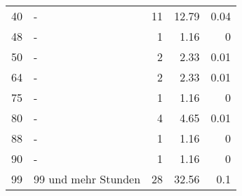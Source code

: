 \begin{longtable}{lXrrr}
        40 & \multicolumn{1}{X}{-} & %
          \num{11} &
          \num[round-mode=places,round-precision=2]{12,79} &
          \num[round-mode=places,round-precision=2]{0,04} \\

        48 & \multicolumn{1}{X}{-} & %
          \num{1} &
          \num[round-mode=places,round-precision=2]{1,16} &
          \num[round-mode=places,round-precision=2]{0} \\

        50 & \multicolumn{1}{X}{-} & %
          \num{2} &
          \num[round-mode=places,round-precision=2]{2,33} &
          \num[round-mode=places,round-precision=2]{0,01} \\

        64 & \multicolumn{1}{X}{-} & %
          \num{2} &
          \num[round-mode=places,round-precision=2]{2,33} &
          \num[round-mode=places,round-precision=2]{0,01} \\

        75 & \multicolumn{1}{X}{-} & %
          \num{1} &
          \num[round-mode=places,round-precision=2]{1,16} &
          \num[round-mode=places,round-precision=2]{0} \\

        80 & \multicolumn{1}{X}{-} & %
          \num{4} &
          \num[round-mode=places,round-precision=2]{4,65} &
          \num[round-mode=places,round-precision=2]{0,01} \\

        88 & \multicolumn{1}{X}{-} & %
          \num{1} &
          \num[round-mode=places,round-precision=2]{1,16} &
          \num[round-mode=places,round-precision=2]{0} \\

        90 & \multicolumn{1}{X}{-} & %
          \num{1} &
          \num[round-mode=places,round-precision=2]{1,16} &
          \num[round-mode=places,round-precision=2]{0} \\

        99 & \multicolumn{1}{X}{99 und mehr Stunden} & %
          \num{28} &
          \num[round-mode=places,round-precision=2]{32,56} &
          \num[round-mode=places,round-precision=2]{0,1} \\


\end{longtable}
